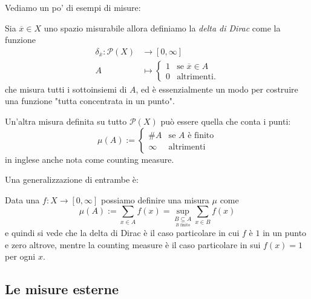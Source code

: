 \documentclass[11pt]{scrartcl}
\newcommand{\parti}[1]{\mathcal{P}\!\left(#1\right)}
\begin{document}
	Vediamo un po' di esempi di misure:
	\begin{definition}
		Sia $\overline{x}\in X$ uno spazio misurabile allora definiamo la \textit{delta di Dirac} come la funzione
		\begin{align*}
			\delta_{\overline{x}}:\parti{X} & \to [0,\infty] \\
			A & \mapsto \begin{cases}
				1 & \text{se $\overline{x}\in A$} \\
				0 & \text{altrimenti.}
			\end{cases} 
		\end{align*}
		che misura tutti i sottoinsiemi di $A$, ed è essenzialmente un modo per costruire una funzione "tutta concentrata in un punto".
	\end{definition}
	
	\begin{example}
		Un'altra misura definita su tutto $\parti{X}$ può essere quella che conta i punti:
		$$
		\mu(A):=
		\begin{cases}
			\# A & \text{se $A$ è finito} \\
			\infty & \text{altrimenti}
		\end{cases}
		$$
		in inglese anche nota come counting measure.
	\end{example}
	Una generalizzazione di entrambe è:
	\begin{example}
		Data una $f:X\to [0,\infty]$ possiamo definire una misura $\mu$ come
		$$\mu(A):=\sum_{x\in A}f(x)=\sup_{\underset{\text{$B$ finito}}{B\subseteq A}}\sum_{x\in B}f(x)$$
		e quindi si vede che la delta di Dirac è il caso particolare in cui $f$ è $1$ in un punto e zero altrove, mentre la counting measure è il caso particolare in sui $f(x)=1$ per ogni $x$.
	\end{example}
	
	\subsection{Le misure esterne}
	
\end{document}
